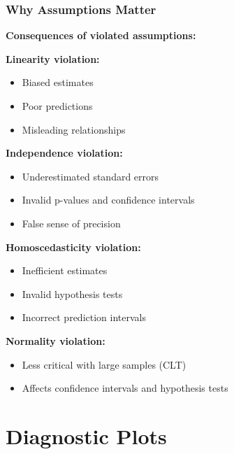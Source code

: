 \documentclass{beamer}
\begin{document}
\begin{frame}
\frametitle{Why Assumptions Matter}
\textbf{Consequences of violated assumptions:}

\vspace{0.3cm}
\textbf{Linearity violation:}
\begin{itemize}
\item Biased estimates
\item Poor predictions
\item Misleading relationships
\end{itemize}

\vspace{0.3cm}
\textbf{Independence violation:}
\begin{itemize}
\item Underestimated standard errors
\item Invalid p-values and confidence intervals
\item False sense of precision
\end{itemize}

\vspace{0.3cm}
\textbf{Homoscedasticity violation:}
\begin{itemize}
\item Inefficient estimates
\item Invalid hypothesis tests
\item Incorrect prediction intervals
\end{itemize}

\vspace{0.3cm}
\textbf{Normality violation:}
\begin{itemize}
\item Less critical with large samples (CLT)
\item Affects confidence intervals and hypothesis tests
\end{itemize}
\end{frame}

\section{Diagnostic Plots}
\end{document}
